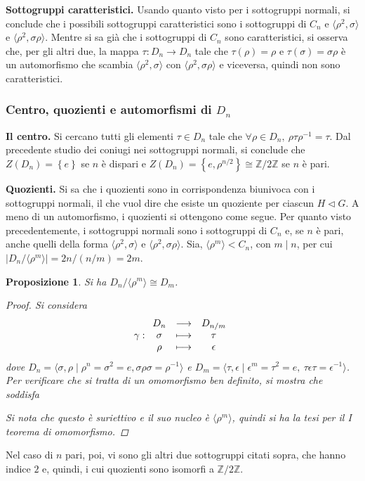 \documentclass[11pt]{scrartcl}
\theoremstyle{style1}
\newtheorem{prop}{Proposizione}[section]
\numberwithin{equation}{subsection}
\renewcommand{\textbf}[1]{\textsf{\bfseries #1}}
\begin{document}
\textbf{Sottogruppi caratteristici.}
Usando quanto visto per i sottogruppi normali, si conclude che i possibili sottogruppi caratteristici sono i sottogruppi di $C_n$ e $\langle \rho ^2,\sigma  \rangle$ e $\langle \rho ^2 , \sigma \rho  \rangle$. 
Mentre si sa gi\`a che i sottogruppi di $C_n$ sono caratteristici, si osserva che, per gli altri due, la mappa $\tau : D_n \to D_n$ tale che $\tau (\rho ) = \rho $ e $\tau (\sigma ) = \sigma \rho $ \`e un automorfismo che scambia $\langle \rho ^2,\sigma  \rangle$ con $\langle \rho ^2, \sigma \rho  \rangle$ e viceversa, quindi non sono caratteristici.
\subsubsection{Centro, quozienti e automorfismi di $D_n$}
\hfill

\textbf{Il centro.} Si cercano tutti gli elementi $\tau  \in D_n$ tale che $\forall \rho  \in D_n, \ \rho \tau \rho ^{-1}=\tau $.
Dal precedente studio dei coniugi nei sottogruppi normali, si conclude che $Z(D_n) = \left\{ e \right\} $ se $n$ \`e dispari e $Z(D_n)=\left\{ e, \rho ^{n / 2}  \right\}\cong \mathbb{Z} / 2\mathbb{Z}$ se $n$ \`e pari.

\vspace{5pt}

\textbf{Quozienti.} 
Si sa che i quozienti sono in corrispondenza biunivoca con i sottogruppi normali, il che vuol dire che esiste un quoziente per ciascun $H \lhd G$.
A meno di un automorfismo, i quozienti si ottengono come segue.
Per quanto visto precedentemente, i sottogruppi normali sono i sottogruppi di $C_n$ e, se $n$ \`e pari, anche quelli della forma $\langle \rho ^2 , \sigma  \rangle$ e $\langle \rho ^2, \sigma \rho  \rangle$. 
Sia, $\langle \rho ^m \rangle< C_n$, con $ m \mid n$, per cui $\lvert D_n / \langle \rho ^m \rangle \rvert = 2n/(n / m) = 2m$.
\begin{prop}
	Si ha $D_n / \langle \rho ^m \rangle\cong D _{m} $.
	\begin{proof}
		Si considera 
		\[
		\gamma : 
		\begin{array}
			{c c c}
			D_n & \longrightarrow& D_{ n / m } \\
			\sigma & \longmapsto & \tau \\
			\rho & \longmapsto & \epsilon 
		\end{array}
		\] 
		dove $D_n = \langle \sigma ,\rho  \mid \rho ^n = \sigma ^2 = e , \sigma \rho \sigma = \rho ^{-1} \rangle$ e $D_{m} = \langle \tau ,\epsilon  \mid \epsilon ^{ m} = \tau ^2 = e , \ \tau \epsilon \tau = \epsilon ^{-1} \rangle$.
		Per verificare che si tratta di un omomorfismo ben definito, si mostra che soddisfa

		Si nota che questo \`e suriettivo e il suo nucleo \`e $\langle \rho ^m \rangle$, quindi si ha la tesi per il I teorema di omomorfismo.
	\end{proof}
\end{prop}
\noindent Nel caso di $n$ pari, poi, vi sono gli altri due sottogruppi citati sopra, che hanno indice $2$ e, quindi, i cui quozienti sono isomorfi a $\mathbb{Z} / 2\mathbb{Z}$.
\end{document}
